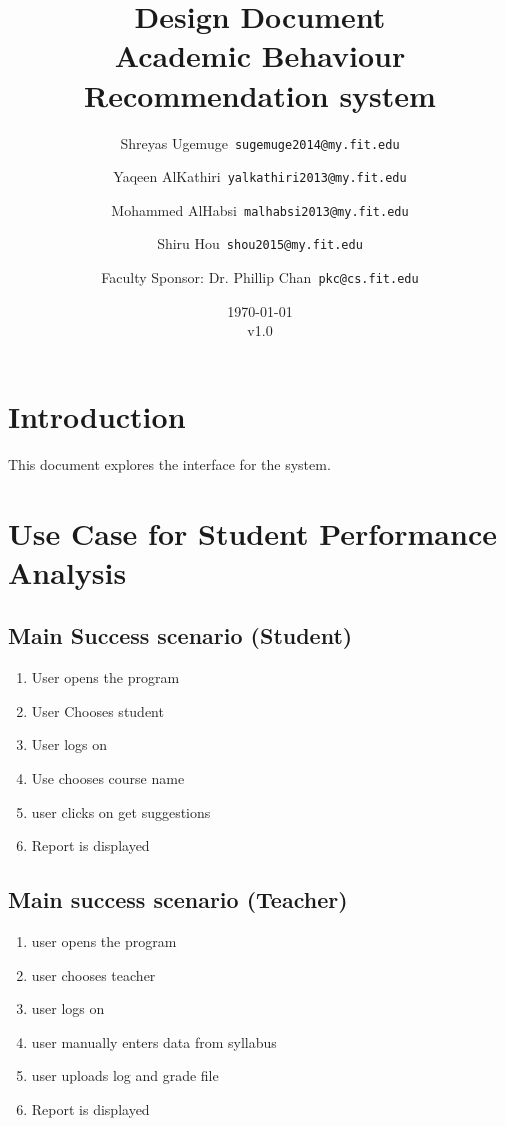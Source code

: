 \documentclass[12pt]{article}
\title{\textbf{Design Document} \\ \hfill \break
	Academic Behaviour Recommendation system}
\author{Shreyas Ugemuge\      \texttt{sugemuge2014@my.fit.edu}
  \and
  Yaqeen AlKathiri\      \texttt{yalkathiri2013@my.fit.edu}
  \and
	Mohammed AlHabsi\      \texttt{malhabsi2013@my.fit.edu}
  \and
  Shiru Hou\      \texttt{shou2015@my.fit.edu}
  \and
  Faculty Sponsor: Dr. Phillip Chan\      \texttt{pkc@cs.fit.edu}}
\date{\today \\ v1.0}
\begin{document}
\maketitle
\pagebreak
\tableofcontents
\pagebreak
\section{Introduction}
This document explores the interface for the system.
\section{Use Case for Student Performance Analysis}
\subsection{Main Success scenario (Student)}
\begin{enumerate}
	\item User opens the program
	\item User Chooses student
	\item User logs on
	\item Use chooses course name
	\item user clicks on get suggestions
	\item Report is displayed
\end{enumerate}
\subsection{Main success scenario (Teacher)}
\begin{enumerate}
	\item user opens the program
	\item user chooses teacher
	\item user logs on
	\item user manually enters data from syllabus
	\item user uploads log and grade file
	\item Report is displayed
 \end{enumerate}
\end{document}
